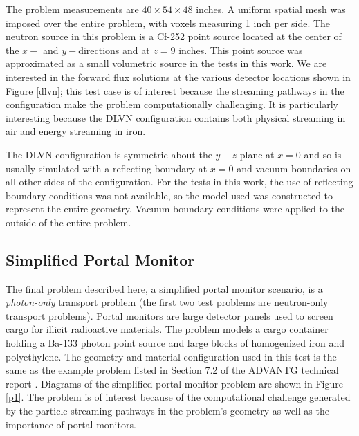 \documentclass{article} %
\begin{document}
The problem measurements are $40\times54\times48$ inches. A uniform spatial
mesh was imposed over the entire problem, with voxels measuring 1 inch per
side. The neutron source in this problem is a Cf-252 point source located at
the center of the $x-$ and $y-$directions and at $z = 9$ inches. This point
source was approximated as a small volumetric source in the tests in this
work. We are interested in the forward flux solutions at the various detector
locations shown in Figure \ref{dlvn}; this test case is of interest
because the streaming pathways in the configuration make the problem
computationally challenging. It is particularly interesting because the DLVN
configuration contains both physical streaming in air and energy streaming in
iron. 

The DLVN configuration is symmetric about the $y-z$ plane at $x = 0$
and so is usually simulated with a reflecting boundary at $x = 0$ and vacuum
boundaries on all other sides of the configuration. For the tests in this work,
the use of reflecting boundary conditions was not available, so the model used 
was constructed to represent the entire geometry.
Vacuum boundary conditions were applied to the outside of the entire problem.

\subsection{Simplified Portal Monitor}

The final problem described here, a simplified portal monitor scenario, is a
\textit{photon-only} transport problem (the first two test problems are
neutron-only transport problems). Portal monitors are large detector
panels used to screen cargo for illicit radioactive materials. The problem
models a cargo container holding a Ba-133 photon point source and large blocks
of homogenized iron and polyethylene. The geometry and material configuration
used in this test is the same as the example problem listed in Section 7.2 of
the ADVANTG technical report \cite{advantg}. Diagrams of the simplified portal
monitor problem are shown in Figure \ref{p1}. The problem is of interest
because of the computational challenge generated by the particle streaming
pathways in the problem's geometry as well as the importance of portal
monitors.
\end{document}
